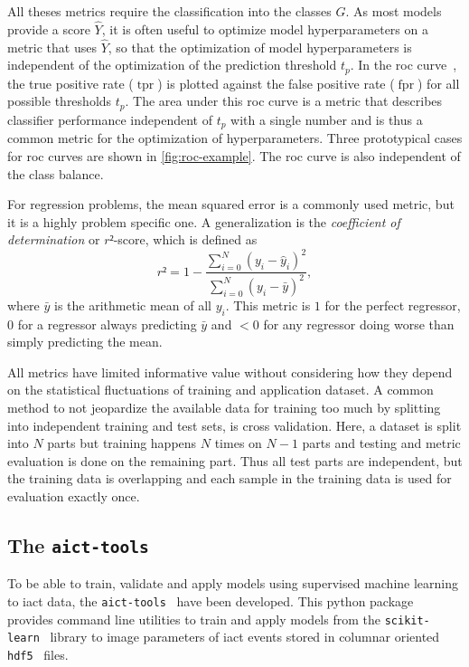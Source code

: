 All theses metrics require the classification into the classes $\hat{G}$.
As most models provide a score $\hat{Y}$, it is often useful to optimize
model hyperparameters on a metric that uses $\hat{Y}$, so that 
the optimization of model hyperparameters is independent of the optimization
of the prediction threshold $t_p$.
In the \gls{roc} curve~\cite{roc}, the true positive rate ($\operatorname{tpr}$) is
plotted against the false positive rate ($\operatorname{fpr}$) for all possible thresholds $t_p$.
The area under this \gls{roc} curve \AROC{} is a metric that describes
classifier performance independent of $t_p$ with a single number and
is thus a common metric for the optimization of hyperparameters.
Three prototypical cases for \gls{roc} curves are shown in \autoref{fig:roc-example}.
The \gls{roc} curve is also independent of the class balance.

For regression problems, the mean squared error is a commonly used metric,
but it is a highly problem specific one.
A generalization is the \emph{coefficient of determination} or $r²$-score,
which is defined as
\begin{equation}
  r² = 1 - \frac{\sum_{i=0}^N ({y_i - \hat{y}_i})^2}{\sum_{i=0}^N (y_i - \bar{y})^2},
\end{equation}
where $\bar{y}$ is the arithmetic mean of all $y_i$.
This metric is $1$ for the perfect regressor, $0$ for a regressor always
predicting $\bar{y}$ and $< 0$ for any regressor doing worse than simply predicting
the mean.

All metrics have limited informative value without considering how they depend
on the statistical fluctuations of training and application dataset.
A common method to not jeopardize the available data for training too much by splitting
into independent training and test sets, is cross validation.
Here, a dataset is split into $N$ parts but training happens $N$ times
on $N - 1$ parts and testing and metric evaluation is done on the remaining part.
Thus all test parts are independent, but the training data is overlapping and
each sample in the training data is used for evaluation exactly once.


\subsection{The \texttt{aict-tools}}

To be able to train, validate and apply models using supervised machine learning
to \gls{iact} data, the \texttt{aict-tools}~\cite{aict-tools} have been developed.
This python package provides command line utilities to train and apply models from
the \texttt{scikit-learn}~\cite{scikit-learn} library to image parameters of
\gls{iact} events stored in columnar oriented \texttt{hdf5}~\cite{hdf5} files.

